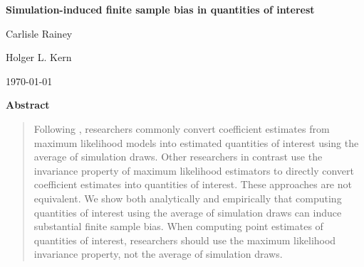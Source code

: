 \documentclass[11pt]{article}
\begin{document}
\begin{center}

{\Large \textbf{Simulation-induced finite sample bias in quantities of interest}}

\vspace{1cm}

Carlisle Rainey

\vspace{5mm}

Holger L. Kern

\vspace{1cm}

\today
\end{center}

\vspace{5mm}

{\centerline{\textbf{Abstract}}}
\begin{quote}\noindent
Following \cite{KingTomzWittenberg2000}, researchers commonly convert coefficient estimates from maximum likelihood models into estimated quantities of interest using the average of simulation draws. Other researchers in contrast use the invariance property of maximum likelihood estimators to directly convert coefficient estimates into quantities of interest. These approaches are not equivalent. We show both analytically and empirically that computing quantities of interest using the average of simulation draws can induce substantial finite sample bias. When computing point estimates of quantities of interest, researchers should use the maximum likelihood invariance property, not the average of simulation draws.\\
\end{quote}



\thispagestyle{empty}
\end{document}
